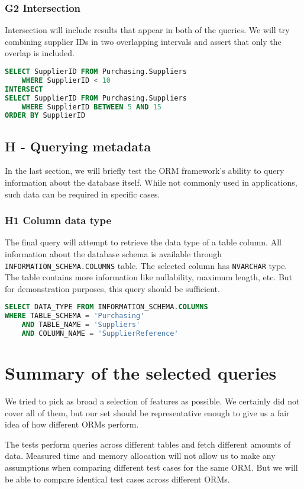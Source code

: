 \subsubsection*{G2 Intersection}

Intersection will include results that appear in both of the queries. We will try combining supplier IDs in two overlapping intervals and assert that only the overlap is included. 

\begin{lstlisting}[language=SQL]
SELECT SupplierID FROM Purchasing.Suppliers 
    WHERE SupplierID < 10
INTERSECT
SELECT SupplierID FROM Purchasing.Suppliers 
    WHERE SupplierID BETWEEN 5 AND 15
ORDER BY SupplierID
\end{lstlisting}

\subsection{H - Querying metadata}
In the last section, we will briefly test the ORM framework's ability to query information about the database itself. While not commonly used in applications, such data can be required in specific cases.
\subsubsection*{H1 Column data type}
The final query will attempt to retrieve the data type of a table column. All information about the database schema is available through \texttt{INFORMATION\_SCHEMA.COLUMNS} table. The selected column has \texttt{NVARCHAR} type. The table contains more information like nullability, maximum length, etc. But for demonstration purposes, this query should be sufficient.

\begin{lstlisting}[language=SQL]
SELECT DATA_TYPE FROM INFORMATION_SCHEMA.COLUMNS 
WHERE TABLE_SCHEMA = 'Purchasing'
    AND TABLE_NAME = 'Suppliers'
    AND COLUMN_NAME = 'SupplierReference'
\end{lstlisting}

\section{Summary of the selected queries}
We tried to pick as broad a selection of features as possible. 
We certainly did not cover all of them, but our set should be representative enough to give us a fair idea of how different ORMs perform. 

The tests perform queries across different tables and fetch different amounts of data. 
Measured time and memory allocation will not allow us to make any assumptions when comparing different test cases for the same ORM.
But we will be able to compare identical test cases across different ORMs.

